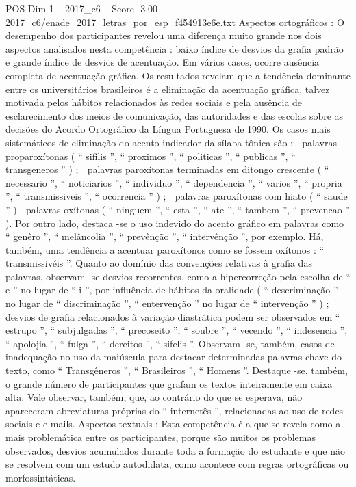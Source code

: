 \begin{textsample}{POS Dim 1 – 2017\_c6 – Score -3.00 – 2017\_c6/enade\_2017\_letras\_por\_esp\_f454913e6e.txt}
Aspectos ortográficos : O desempenho dos participantes revelou uma diferença muito grande nos dois aspectos analisados nesta competência : baixo índice de desvios da grafia padrão e grande índice de desvios de acentuação.
Em vários casos, ocorre ausência completa de acentuação gráfica.
Os resultados revelam que a tendência dominante entre os universitários brasileiros é a eliminação da acentuação gráfica, talvez motivada pelos hábitos relacionados às redes sociais e pela ausência de esclarecimento dos meios de comunicação, das autoridades e das escolas sobre as decisões do Acordo Ortográfico da Língua Portuguesa de 1990.
Os casos mais sistemáticos de eliminação do acento indicador da sílaba tônica são :  palavras proparoxítonas ( “ sifilis ”, “ proximos ”, “ politicas ”, “ publicas ”, “ transgeneros ” ) ;  palavras paroxítonas terminadas em ditongo crescente ( “ necessario ”, “ noticiarios ”, “ individuo ”, “ dependencia ”, “ varios ”, “ propria ”, “ transmissiveis ”, “ ocorrencia ” ) ;  palavras paroxítonas com hiato ( “ saude ” )  palavras oxítonas ( “ ninguem ”, “ esta ”, “ ate ”, “ tambem ”, “ prevencao ” ).
Por outro lado, destaca -se o uso indevido do acento gráfico em palavras como “ genêro ”, “ melâncolia ”, “ prevênção ”, “ intervênção ”, por exemplo.
Há, também, uma tendência a acentuar paroxítonos como se fossem oxítonos : “ transmissivéis ”.
Quanto ao domínio das convenções relativas à grafia das palavras, observam -se desvios recorrentes, como a hipercorreção pela escolha de “ e ” no lugar de “ i ”, por influência de hábitos da oralidade ( “ descriminação ” no lugar de “ discriminação ”, “ entervenção ” no lugar de “ intervenção ” ) ; desvios de grafia relacionados à variação diastrática podem ser observados em “ estrupo ”, “ subjulgadas ”, “ precoseito ”, “ soubre ”, “ vecendo ”, “ indesencia ”, “ apolojia ”, “ fulga ”, “ dereitos ”, “ sifelis ”.
Observam -se, também, casos de inadequação no uso da maiúscula para destacar determinadas palavras-chave do texto, como “ Transgêneros ”, “ Brasileiros ”, “ Homens ”.
Destaque -se, também, o grande número de participantes que grafam os textos inteiramente em caixa alta.
Vale observar, também, que, ao contrário do que se esperava, não apareceram abreviaturas próprias do “ internetês ”, relacionadas ao uso de redes sociais e e-mails.
Aspectos textuais : Esta competência é a que se revela como a mais problemática entre os participantes, porque são muitos os problemas observados, desvios acumulados durante toda a formação do estudante e que não se resolvem com um estudo autodidata, como acontece com regras ortográficas ou morfossintáticas.

\end{textsample}
